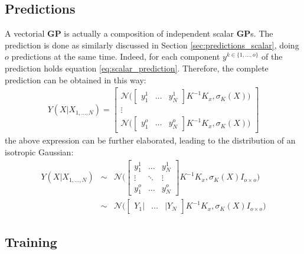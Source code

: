 \documentclass{article}
\begin{document}
\subsection{Predictions}

A vectorial \textbf{GP} is actually a composition of independent scalar \textbf{GP}s.
The prediction is done as similarly discussed in Section \ref{sec:predictions_scalar}, doing $o$ predictions at the same time. Indeed, for each component $y^{k \in \lbrace 1, \hdots ,o\rbrace}$ of the prediction  holds equation \ref{eq:scalar_prediction}. Therefore, the complete prediction can be obtained in this way:
\begin{eqnarray}
Y(X| X_{1,\hdots,N}) = \begin{bmatrix}
\mathcal{N} \bigg (
\begin{bmatrix} y^1_1 & \hdots & y^1_N \end{bmatrix}
K^{-1} K_x, 
\sigma_K(X)
\bigg ) \\ 
\vdots \\
\mathcal{N} \bigg (
\begin{bmatrix} y^o_1 & \hdots & y^o_N \end{bmatrix}
K^{-1} K_x, 
\sigma_K(X)
\bigg ) 
\end{bmatrix} 
\end{eqnarray}
the above expression can be further elaborated, leading to the distribution of an isotropic Gaussian:
\begin{eqnarray}
Y(X| X_{1,\hdots,N}) 
&\sim &
\mathcal{N} \bigg (
\begin{bmatrix} 
y^1_1 & \hdots & y^1_N \\
\vdots & \ddots & \vdots \\
y^o_1 & \hdots & y^o_N
\end{bmatrix} K^{-1} K_x
, \sigma_K(X) I_{o \times o}
\bigg )
\\
&\sim &
\mathcal{N} \bigg (
\begin{bmatrix} Y_1 | & \hdots & | Y_N \end{bmatrix} K^{-1} K_x
, \sigma_K(X) I_{o \times o}
\bigg )
\end{eqnarray}

\subsection{Training}
\label{sec:train_vectorial}
\end{document}
